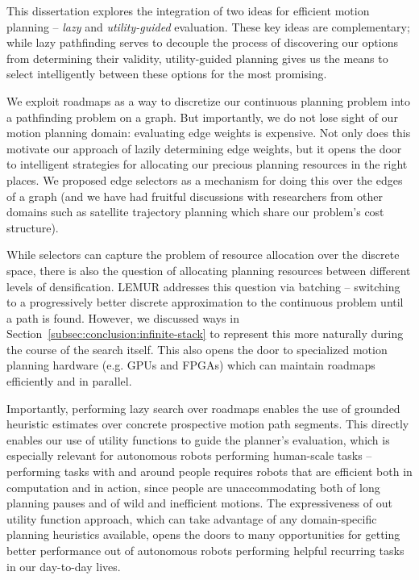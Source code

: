 This dissertation explores the integration of two ideas
for efficient motion planning
-- \emph{lazy} and \emph{utility-guided} evaluation.
These key ideas are complementary;
while lazy pathfinding serves to decouple the process of
discovering our options from determining their validity,
utility-guided planning gives us the means to select intelligently
between these options for the most promising.

We exploit roadmaps as a way to discretize our continuous planning
problem into a pathfinding problem on a graph.
But importantly, we do not lose sight of our motion planning domain:
evaluating edge weights is expensive.
Not only does this motivate our approach of lazily determining edge
weights,
but it opens the door to intelligent strategies for allocating our
precious planning resources in the right places.
We proposed edge selectors as a mechanism for doing this over the
edges of a graph
(and we have had fruitful discussions with researchers from other
domains such as satellite trajectory planning
which share our problem's cost structure).

While selectors can capture the problem of resource allocation
over the discrete space,
there is also the question of allocating planning resources between
different levels of densification.
LEMUR addresses this question via batching -- switching to a
progressively better discrete approximation to the continuous problem
until a path is found.
However, we discussed ways in Section~\ref{subsec:conclusion:infinite-stack}
to represent this more naturally during the course of the search itself.
This also opens the door to specialized motion planning hardware
(e.g. GPUs and FPGAs) which can maintain roadmaps efficiently
and in parallel.

Importantly,
performing lazy search over roadmaps enables the use of grounded
heuristic estimates over concrete prospective motion path segments.
This directly enables our use of utility functions to guide the planner's
evaluation,
which is especially relevant for autonomous robots performing
human-scale tasks
-- performing tasks with and around people requires robots
that are efficient both in computation and in action,
since people are unaccommodating both of long planning pauses
and of wild and inefficient motions.
The expressiveness of out utility function approach,
which can take advantage of any domain-specific planning heuristics
available,
opens the doors to many opportunities for getting better performance
out of autonomous robots performing helpful recurring tasks in our
day-to-day lives.

